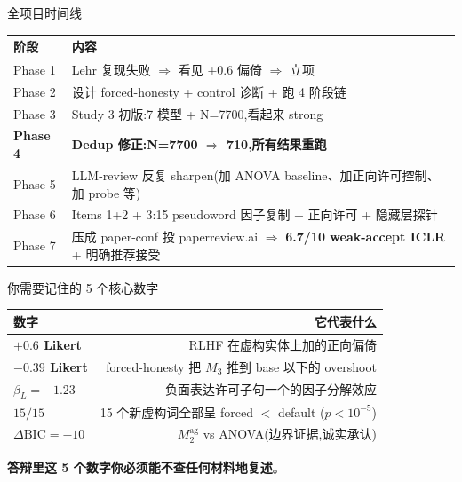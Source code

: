 \documentclass[aspectratio=169,11pt]{ctexbeamer}
\newcommand{\hi}[1]{\textcolor{ow-red}{\textbf{#1}}}
\newcommand{\hib}[1]{\textcolor{ow-blue}{\textbf{#1}}}
\begin{document}
\begin{frame}{全项目时间线}
\small
\begin{tabular}{p{2.5cm}p{9.5cm}}
\toprule
阶段 & 内容 \\
\midrule
Phase 1 & Lehr 复现失败 $\Rightarrow$ 看见 +0.6 偏倚 $\Rightarrow$ 立项 \\
Phase 2 & 设计 forced-honesty + control 诊断 + 跑 4 阶段链 \\
Phase 3 & Study 3 初版:7 模型 + N=7700,看起来 strong \\
\hi{Phase 4} & \hi{Dedup 修正:N=7700 $\Rightarrow$ 710,所有结果重跑} \\
Phase 5 & LLM-review 反复 sharpen(加 ANOVA baseline、加正向许可控制、加 probe 等) \\
Phase 6 & Items 1+2 + 3:15 pseudoword 因子复制 + 正向许可 + 隐藏层探针 \\
Phase 7 & 压成 paper-conf 投 paperreview.ai $\Rightarrow$ \hi{6.7/10 weak-accept ICLR} + 明确推荐接受 \\
\bottomrule
\end{tabular}
\end{frame}

\begin{frame}{你需要记住的 5 个核心数字}
\large
\begin{center}
\begin{tabular}{lr}
\toprule
\textbf{数字} & \textbf{它代表什么} \\
\midrule
\hi{$+0.6$ Likert} & RLHF 在虚构实体上加的正向偏倚\\[2pt]
\hi{$-0.39$ Likert} & forced-honesty 把 $M_3$ 推到 base 以下的 overshoot \\[2pt]
\hi{$\beta_L = -1.23$} & 负面表达许可子句一个的因子分解效应 \\[2pt]
\hi{$15/15$} & 15 个新虚构词全部呈 forced $<$ default ($p<10^{-5}$) \\[2pt]
\hi{$\Delta\text{BIC} = -10$} & $M_2^\text{ag}$ vs ANOVA(边界证据,诚实承认)\\
\bottomrule
\end{tabular}
\end{center}

\bigskip
\bigskip
\hib{答辩里这 5 个数字你必须能不查任何材料地复述}。
\end{frame}
\end{document}
